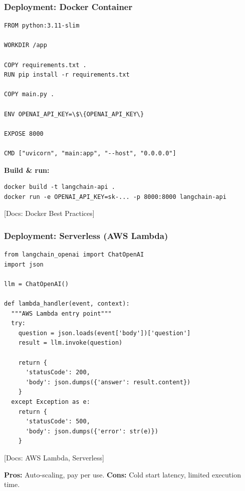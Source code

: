 \documentclass[aspectratio=169,11pt]{beamer}
\newcommand{\docref}[1]{{\scriptsize\color{docgray}[Docs: #1]}}
\begin{document}
\begin{frame}[fragile]
\frametitle{Deployment: Docker Container}
\vspace{-0.3cm}

\begin{lstlisting}
FROM python:3.11-slim

WORKDIR /app

COPY requirements.txt .
RUN pip install -r requirements.txt

COPY main.py .

ENV OPENAI_API_KEY=\$\{OPENAI_API_KEY\}

EXPOSE 8000

CMD ["uvicorn", "main:app", "--host", "0.0.0.0"]
\end{lstlisting}

\textbf{Build \& run:}
\begin{lstlisting}
docker build -t langchain-api .
docker run -e OPENAI_API_KEY=sk-... -p 8000:8000 langchain-api
\end{lstlisting}

\docref{Docker Best Practices}

\end{frame}

\begin{frame}[fragile,shrink=5]
\frametitle{Deployment: Serverless (AWS Lambda)}

\begin{lstlisting}
from langchain_openai import ChatOpenAI
import json

llm = ChatOpenAI()

def lambda_handler(event, context):
  """AWS Lambda entry point"""
  try:
    question = json.loads(event['body'])['question']
    result = llm.invoke(question)

    return {
      'statusCode': 200,
      'body': json.dumps({'answer': result.content})
    }
  except Exception as e:
    return {
      'statusCode': 500,
      'body': json.dumps({'error': str(e)})
    }
\end{lstlisting}

\docref{AWS Lambda, Serverless}

\textbf{Pros:} Auto-scaling, pay per use. \textbf{Cons:} Cold start latency, limited execution time.

\end{frame}
\end{document}
